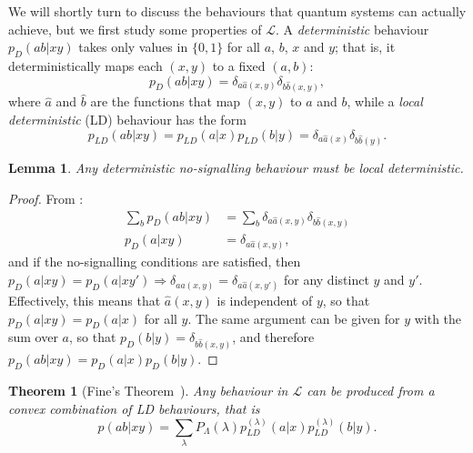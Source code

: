 \documentclass[10pt, a4paper]{article}
\numberwithin{equation}{section} %
\newcounter{stmt} %
\theoremstyle{definition}
\theoremstyle{plain}
\newtheorem{theorem}[stmt]{Theorem}
\newtheorem{lemma}[stmt]{Lemma}
\newcommand{\?}{\mathrel{?}} %
\newcommand{\Ls}{\mathcal{L}}
\begin{document}
    We will shortly turn to discuss the behaviours that quantum systems can actually achieve, but we first study some properties of \(\Ls\). A \emph{deterministic} behaviour \(p_D(ab|xy)\) takes only values in \(\{0,1\}\) for all \(a\), \(b\), \(x\) and \(y\); that is, it deterministically maps each \((x,y)\) to a fixed \((a,b)\):
    \begin{equation}\label{eqn:deterdef}
      p_D(ab|xy) = \delta_{a\hat{a}(x,y)}\delta_{b\hat{b}(x,y)},
    \end{equation}
    where \(\hat{a}\) and \(\hat{b}\) are the functions that map \((x,y)\) to \(a\) and \(b\), while a \emph{local deterministic} (LD) behaviour has the form
    \begin{equation}
      p_{LD}(ab|xy) = p_{LD}(a|x)p_{LD}(b|y) = \delta_{a\hat{a}(x)}\delta_{b\hat{b}(y)}.
    \end{equation}

    \begin{lemma}\label{thm:NSLD}
      Any deterministic no-signalling behaviour must be local deterministic.
    \end{lemma}
    \begin{proof}
      From :
      \begin{align}
        \sum_b p_D(ab|xy) &= \sum_b \delta_{a\hat{a}(x,y)}\delta_{b\hat{b}(x,y)} \\
        p_D(a|xy) &= \delta_{a\hat{a}(x,y)},
      \end{align}
      and if the no-signalling conditions are satisfied, then \(p_D(a|xy) = p_D(a|xy') \Rightarrow \delta_{a\hat{a}(x,y)} = \delta_{a\hat{a}(x,y')}\) for any distinct \(y\) and \(y'\). Effectively, this means that \(\hat{a}(x,y)\) is independent of \(y\), so that \(p_D(a|xy) = p_D(a|x)\) for all \(y\). The same argument can be given for \(y\) with the sum over \(a\), so that \(p_D(b|y) = \delta_{b\hat{b}(x,y)}\), and therefore \(p_D(ab|xy) = p_D(a|x)p_D(b|y)\). 
    \end{proof}

    \begin{theorem}[Fine's Theorem~\cite{FineThm}]
      Any behaviour in \(\Ls\) can be produced from a convex combination of LD behaviours, that is 
      \begin{equation}
        p(ab|xy) = \sum_{\lambda} P_{\Lambda}(\lambda) p_{LD}^{(\lambda)}(a|x)p_{LD}^{(\lambda)}(b|y).
      \end{equation}
    \end{theorem}
\end{document}
